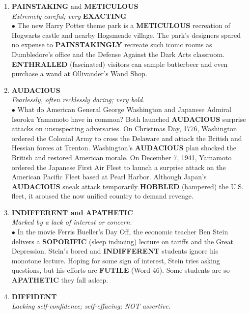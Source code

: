\documentclass{book}
\begin{document}
\begin{enumerate}
\item \textbf{PAINSTAKING} and \textbf{METICULOUS}\\ \textit{Extremely careful; very} \textbf{EXACTING}\\

$\bullet$ The new Harry Potter theme park is a \textbf{METICULOUS}
recreation of Hogwarts castle and nearby Hogsmeade
village. The park's designers spared no expense to
\textbf{PAINSTAKINGLY} recreate such iconic rooms as
Dumbledore's office and the Defense Against the Dark
Arts classroom. \textbf{ENTHRALLED} (fascinated) visitors
can sample butterbeer and even purchase a wand at
Ollivander's Wand Shop.

\item \textbf{AUDACIOUS}\\
\textit{Fearlessly, often recklessly daring; very bold.}\\

$\bullet$ What do American General George Washington and
Japanese Admiral Isoroku Yamamoto have in
common? Both launched \textbf{AUDACIOUS} surprise
attacks on unsuspecting adversaries. On Christmas
Day, 1776, Washington ordered the Colonial Army to
cross the Delaware and attack the British and Hessian
forces at Trenton. Washington's \textbf{AUDACIOUS} plan
shocked the British and restored American morale.
On December 7, 1941, Yamamoto ordered the
Japanese First Air Fleet to launch a surprise attack on
the American Pacific Fleet based at Pearl Harbor.
Although Japan's \textbf{AUDACIOUS} sneak attack
temporarily \textbf{HOBBLED} (hampered) the U.S. fleet, it
aroused the now unified country to demand revenge.

\item  \textbf{INDIFFERENT and APATHETIC}\\ \textit{Marked by a lack of interest or concern.}\\

$\bullet$ In the movie Ferris Bueller's Day Off, the economic
teacher Ben Stein delivers a \textbf{SOPORIFIC} (sleep inducing) lecture on tariffs and the Great Depression.
Stein's bored and \textbf{INDIFFERENT} students ignore his
monotone lecture. Hoping for some sign of interest,
Stein tries asking questions, but his efforts are
\textbf{FUTILE} (Word 46). Some students are so
\textbf{APATHETIC} they fall asleep.

\item \textbf{DIFFIDENT}\\
\textit{Lacking self-confidence; self-effacing; NOT assertive.}\\


\end{enumerate}
\end{document}
